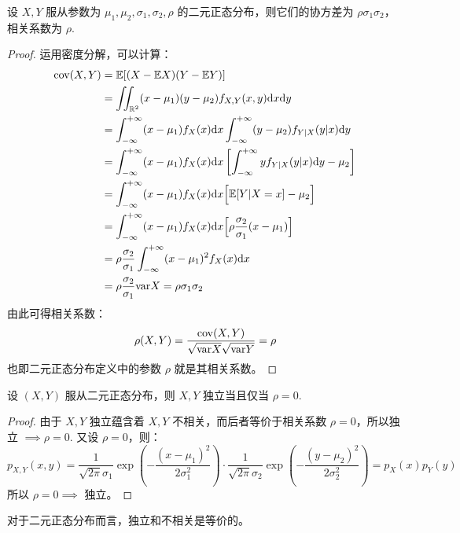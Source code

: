 \begin{theorem}[二元正态分布的协方差与相关系数]
设 $X,Y$ 服从参数为 $\mu_1,\mu_2,\sigma_1,\sigma_2,\rho$ 的二元正态分布，则它们的协方差为 $\rho\sigma_1\sigma_2$，相关系数为 $\rho$.
\end{theorem}
\begin{proof}
运用密度分解，可以计算：
\begin{align*}
\text{cov}(X,Y)&=\mathbb E[(X-\mathbb EX)(Y-\mathbb EY)]\\
&=\iint_{\mathbb{R}^2}(x-\mu_1)(y-\mu_2)f_{X,Y}(x,y)\mathrm dx\mathrm dy\\
&=\int_{-\infty}^{+\infty}(x-\mu_1)f_X(x)\mathrm dx\int_{-\infty}^{+\infty}(y-\mu_2)f_{Y|X}(y|x)\mathrm dy\\
&=\int_{-\infty}^{+\infty}(x-\mu_1)f_X(x)\mathrm dx\left[\int_{-\infty}^{+\infty}yf_{Y|X}(y|x)\mathrm dy-\mu_2\right]\\
&=\int_{-\infty}^{+\infty}(x-\mu_1)f_X(x)\mathrm dx\Big[\mathbb E[Y|X=x]-\mu_2\Big]\\
&=\int_{-\infty}^{+\infty}(x-\mu_1)f_X(x)\mathrm dx\Big[\rho\frac{\sigma_2}{\sigma_1}(x-\mu_1)\Big]\\
&=\rho\frac{\sigma_2}{\sigma_1}\int_{-\infty}^{+\infty}(x-\mu_1)^2f_X(x)\mathrm dx\\
&=\rho\frac{\sigma_2}{\sigma_1}\mathrm{var} X=\rho\sigma_1\sigma_2
\end{align*}
由此可得相关系数：
\[
\rho(X,Y)=\frac{\mathrm{cov}(X,Y)}{\sqrt{\mathrm{var} X}\sqrt{\mathrm{var} Y}}=\rho
\]
也即二元正态分布定义中的参数 $\rho$ 就是其相关系数。
\end{proof}

\begin{theorem}[二元正态分布的独立性]
设 $(X,Y)$ 服从二元正态分布，则 $X,Y$ 独立当且仅当 $\rho=0$. 
\end{theorem}
\begin{proof}
由于 $X,Y$ 独立蕴含着 $X,Y$ 不相关，而后者等价于相关系数 $\rho=0$，所以独立 $\implies\rho=0$. 又设 $\rho=0$，则：
\[
p_{X,Y}(x,y)=\frac{1}{\sqrt{2\pi}\sigma_1}\exp\left(-\frac{(x-\mu_1)^2}{2\sigma_1^2}\right)\cdot \frac{1}{\sqrt{2\pi}\sigma_2}\exp\left(-\frac{(y-\mu_2)^2}{2\sigma_2^2}\right)=p_X(x)p_Y(y)
\]
所以 $\rho=0\implies$ 独立。
\end{proof}
\begin{corollary}
对于二元正态分布而言，独立和不相关是等价的。
\end{corollary}
